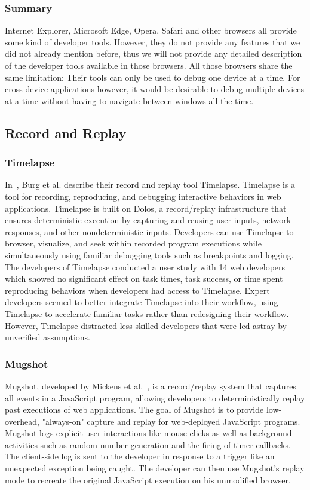 \subsubsection{Summary}

Internet Explorer, Microsoft Edge, Opera, Safari and other browsers all provide some kind of developer tools. However, they do not provide any features that we did not already mention before, thus we will not provide any detailed description of the developer tools available in those browsers. All those browsers share the same limitation: Their tools can only be used to debug one device at a time. For cross-device applications however, it would be desirable to debug multiple devices at a time without having to navigate between windows all the time.

\subsection{Record and Replay}

\subsubsection{Timelapse}

In~\cite{timelapse2013}, Burg et al. describe their record and replay tool Timelapse. Timelapse is a tool for recording, reproducing, and debugging interactive behaviors in web applications. Timelapse is built on Dolos, a record/replay infrastructure that ensures deterministic execution by capturing and reusing user inputs, network responses, and other nondeterministic inputs. Developers can use Timelapse to browser, visualize, and seek within recorded program executions while simultaneously using familiar debugging tools such as breakpoints and logging. The developers of Timelapse conducted a user study with 14 web developers which showed no significant effect on task times, task success, or time spent reproducing behaviors when developers had access to Timelapse. Expert developers seemed to better integrate Timelapse into their workflow, using Timelapse to accelerate familiar tasks rather than redesigning their workflow. However, Timelapse distracted less-skilled developers that were led astray by unverified assumptions.

\subsubsection{Mugshot}

Mugshot, developed by Mickens et al.~\cite{mugshot2010}, is a record/replay system that captures all events in a JavaScript program, allowing developers to deterministically replay past executions of web applications. The goal of Mugshot is to provide low-overhead, "always-on" capture and replay for web-deployed JavaScript programs. Mugshot logs explicit user interactions like mouse clicks as well as background activities such as random number generation and the firing of timer callbacks. The client-side log is sent to the developer in response to a trigger like an unexpected exception being caught. The developer can then use Mugshot's replay mode to recreate the original JavaScript execution on his unmodified browser. 

